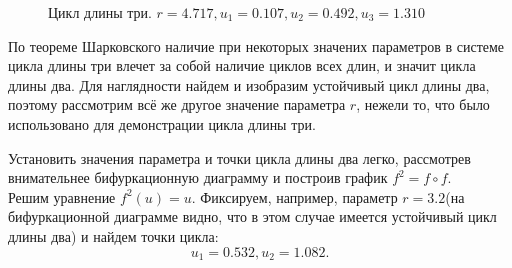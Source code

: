 \documentclass[10pt]{article}
\numberwithin{equation}{section}
\begin{document}
\begin{figure}[h]
    \centering
    \qquad
    \caption{Цикл длины три. \( r = 4.717, u_1 = 0.107, u_2 = 0.492, u_3 = 1.310 \) }
\end{figure}
 
По теореме Шарковского наличие при некоторых значених параметров в системе цикла длины три влечет за собой наличие циклов всех длин, и значит цикла длины два. Для наглядности найдем и изобразим устойчивый цикл длины два, поэтому рассмотрим всё же другое значение параметра \( r \), нежели то, что было использовано для демонстрации цикла длины три.

Установить значения параметра и точки цикла длины два легко, рассмотрев внимательнее бифуркационную диаграмму и построив график \( f^2 = f \circ f \). \\
Решим уравнение \(f^2(u) = u \). Фиксируем, например, параметр \( r = 3.2 \)(на бифуркационной диаграмме видно, что в этом случае имеется устойчивый цикл длины два) и найдем точки цикла:
\[ u_1 = 0.532, u_2 = 1.082. \]
\end{document}
